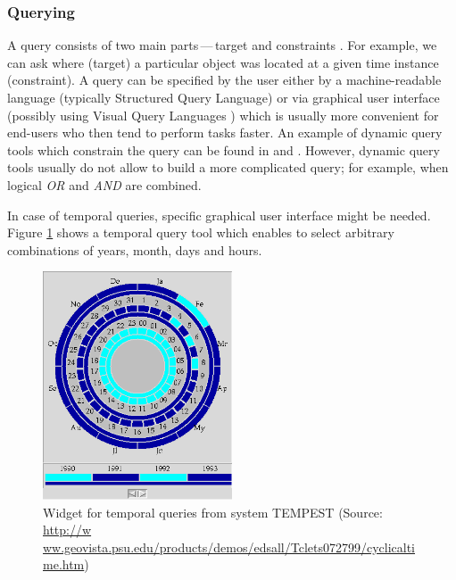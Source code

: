 \documentclass[a4paper,12pt,oneside]{book}
\newcommand{\dash}{\mbox{\,---\,}}
\begin{document}
\subsubsection{Querying}
A query consists of two main parts\dash target and constraints \cite{andrienko2003exploratory}.
For example, we can ask where (target) a particular object was located at a given time instance (constraint).
A query can be specified by the user either by a machine-readable language (typically Structured Query Language)
or via graphical user interface (possibly using Visual Query Languages \cite{catarci1997visual})
which is usually more convenient for end-users who then tend to perform tasks faster.
An example of dynamic query tools which constrain the query can be found
in \cite{ahlberg1992dynamic} and \cite{hochheiser2004dynamic}.
However, dynamic query tools usually do not allow to build a more complicated query;
for example, when logical \emph{OR} and \emph{AND} are combined.


In case of temporal queries, specific graphical user interface
might be needed. Figure \ref{fig:cyclical_time} shows a temporal query tool
which enables to select arbitrary combinations of years, month, days and hours.


\begin{figure}[h!]
  \centering
  \includegraphics[width=0.5\textwidth]{./images/cyclical_time.png}
  \caption[Widget for temporal queries from system TEMPEST]
        {Widget for temporal queries from system TEMPEST (Source:
      \url{http://w ww.geovista.psu.edu/products/demos/edsall/Tclets072799/cyclicaltime.htm})}
  \label{fig:cyclical_time}
\end{figure}
\end{document}
